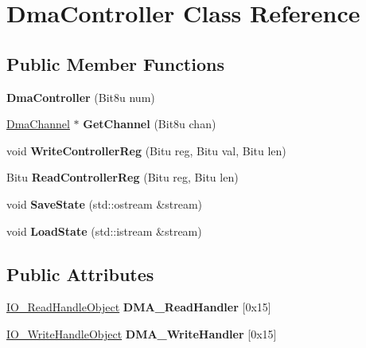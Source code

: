 \hypertarget{classDmaController}{\section{Dma\-Controller Class Reference}
\label{classDmaController}
}
\subsection*{Public Member Functions}
\begin{DoxyCompactItemize}
\item 
\hypertarget{classDmaController_a30d3a9f46dd43dd2135e48f03a47d2fd}{{\bfseries Dma\-Controller} (Bit8u num)}\label{classDmaController_a30d3a9f46dd43dd2135e48f03a47d2fd}

\item 
\hypertarget{classDmaController_a43703c996fcc2913b8a3e41fc472abcf}{\hyperlink{classDmaChannel}{Dma\-Channel} $\ast$ {\bfseries Get\-Channel} (Bit8u chan)}\label{classDmaController_a43703c996fcc2913b8a3e41fc472abcf}

\item 
\hypertarget{classDmaController_a9b1c5a36779958c5f41538fc14c7ab5c}{void {\bfseries Write\-Controller\-Reg} (Bitu reg, Bitu val, Bitu len)}\label{classDmaController_a9b1c5a36779958c5f41538fc14c7ab5c}

\item 
\hypertarget{classDmaController_a1941d446f787328736f8fe4652f5b1aa}{Bitu {\bfseries Read\-Controller\-Reg} (Bitu reg, Bitu len)}\label{classDmaController_a1941d446f787328736f8fe4652f5b1aa}

\item 
\hypertarget{classDmaController_a43ae45635a4bb1bcca49b6675a04f132}{void {\bfseries Save\-State} (std\-::ostream \&stream)}\label{classDmaController_a43ae45635a4bb1bcca49b6675a04f132}

\item 
\hypertarget{classDmaController_a692d89f0eeb164eca32fa293ffbffe0f}{void {\bfseries Load\-State} (std\-::istream \&stream)}\label{classDmaController_a692d89f0eeb164eca32fa293ffbffe0f}

\end{DoxyCompactItemize}
\subsection*{Public Attributes}
\begin{DoxyCompactItemize}
\item 
\hypertarget{classDmaController_a889641452643bba75fd37f0fb557e913}{\hyperlink{classIO__ReadHandleObject}{I\-O\-\_\-\-Read\-Handle\-Object} {\bfseries D\-M\-A\-\_\-\-Read\-Handler} \mbox{[}0x15\mbox{]}}\label{classDmaController_a889641452643bba75fd37f0fb557e913}

\item 
\hypertarget{classDmaController_aa1b220a17570b76681fdff3cc1453bd9}{\hyperlink{classIO__WriteHandleObject}{I\-O\-\_\-\-Write\-Handle\-Object} {\bfseries D\-M\-A\-\_\-\-Write\-Handler} \mbox{[}0x15\mbox{]}}\label{classDmaController_aa1b220a17570b76681fdff3cc1453bd9}

\end{DoxyCompactItemize}


